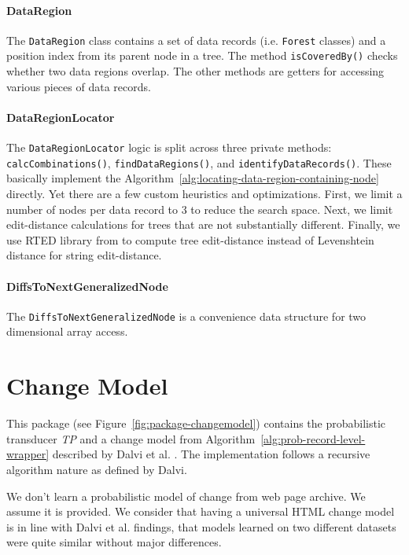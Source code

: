 
\paragraph{DataRegion} The \texttt{DataRegion} class contains a set of data records (i.e. \texttt{Forest} classes) and a position index from its parent node in a tree. The method \texttt{isCoveredBy()} checks whether two data regions overlap. The other methods are getters for accessing various pieces of data records.

\paragraph{DataRegionLocator} The \texttt{DataRegionLocator} logic is split across three private methods: \texttt{calcCombinations()}, \texttt{findDataRegions()}, and \texttt{identifyDataRecords()}. These basically implement the Algorithm~\ref{alg:locating-data-region-containing-node} directly. Yet there are a few custom heuristics and optimizations. First, we limit a number of nodes per data record to 3 to reduce the search space. Next, we limit edit-distance calculations for trees that are not substantially different. Finally, we use RTED library from \cite{pawlik2011a} to compute tree edit-distance instead of Levenshtein distance for string edit-distance.

\paragraph{DiffsToNextGeneralizedNode} The \texttt{DiffsToNextGeneralizedNode} is a convenience data structure for two dimensional array access.


\section{Change Model}

This package (see Figure~\ref{fig:package-changemodel}) contains the probabilistic transducer \emph{TP} and a change model from Algorithm~\ref{alg:prob-record-level-wrapper} described by Dalvi et al. \cite{dalvi2009a}. The implementation follows a recursive algorithm nature as defined by Dalvi. 

We don't learn a probabilistic model of change from web page archive. We assume it is provided. We consider that having a universal HTML change model is in line with Dalvi et al. \cite{dalvi2009a} findings, that models learned on two different datasets were quite similar without major differences.

